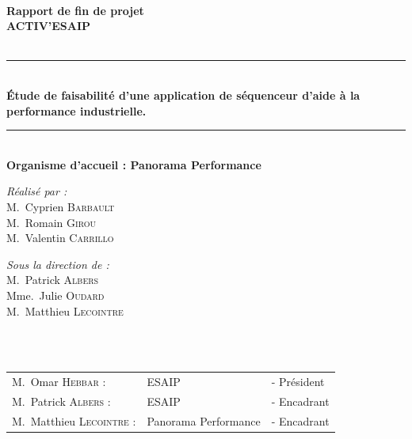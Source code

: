 \begin{titlepage}
\begin{center}
\begin{minipage}{2.5cm}
\end{minipage}
\textsc{\Large }\\[1.5cm]
{\large \bfseries Rapport de fin de projet}\\[0.5cm]

{\huge \bfseries \uppercase{Activ'ESAIP} \\[0.5cm] }
\textsc{\Large }\\[1cm]

\rule{\linewidth}{0.3mm} \\[0.4cm]
{ \huge \bfseries\color{blue!70!black} Étude de faisabilité d'une application de séquenceur d'aide à la performance industrielle.\\[0.4cm] }
\rule{\linewidth}{0.3mm} \\[1cm]
{\large \bfseries Organisme d'accueil : Panorama Performance}\\[1cm]
\noindent
\begin{minipage}{0.4\textwidth}
  \begin{flushleft} \large
    \emph{\color{orange!80!black}Réalisé par :}\\
    M.~Cyprien \textsc{Barbault}\\
    M.~Romain \textsc{Girou}\\
    M.~Valentin \textsc{Carrillo}\\
  \end{flushleft}
\end{minipage}%
\begin{minipage}{0.5\textwidth}
  \begin{flushright} \large
    \emph{\color{orange!80!black}Sous la direction de :} \\
    M.~Patrick \textsc{Albers} \\
    Mme.~Julie \textsc{Oudard} \\
    M.~Matthieu \textsc{Lecointre} \\
  \end{flushright}
\end{minipage}\\[1cm]

\\[0.5cm]

\color{black}
\centering
\begin{tabular}{lll}
\large M.~Omar \textsc{Hebbar} : & \large ESAIP & \large - Président \\[0.1cm]
\large M.~Patrick \textsc{Albers} : & \large ESAIP & \large - Encadrant \\[0.1cm]
\large M.~Matthieu \textsc{Lecointre} : & \large Panorama Performance & \large - Encadrant \\[0.1cm]
\end{tabular}


\end{center}
\end{titlepage}
